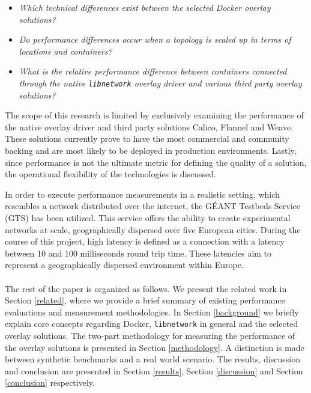 \begin{itemize}
	\setlength\itemsep{1pt}
    \item \textit{Which technical differences exist between the selected Docker overlay solutions?}
    \item \textit{Do performance differences occur when a topology is scaled up in terms of locations and containers?}
    \item \textit{What is the relative performance difference between containers connected through the native \texttt{libnetwork} overlay driver and various third party overlay solutions?}
\end{itemize}

\noindent
The scope of this research is limited by exclusively examining the performance of the native overlay driver and third party solutions Calico, Flannel and Weave. These solutions currently prove to have the most commercial and community backing and are most likely to be deployed in production environments. Lastly, since performance is not the ultimate metric for defining the quality of a solution, the operational flexibility of the technologies is discussed. 

In order to execute performance measurements in a realistic setting, which resembles a network distributed over the internet, the GÉANT Testbeds Service (GTS) has been utilized. This service offers the ability to create experimental networks at scale, geographically dispersed over five European cities. During the course of this project, high latency is defined as a connection with a latency between 10 and 100 milliseconds round trip time. These latencies aim to represent a geographically dispersed environment within Europe. 
\\\\
The rest of the paper is organized as follows. We present the related work in Section \ref{related}, where we provide a brief summary of existing performance evaluations and measurement methodologies. In Section \ref{background} we briefly explain core concepts regarding Docker, \texttt{libnetwork} in general and the selected overlay solutions. The two-part methodology for measuring the performance of the overlay solutions is presented in Section \ref{methodology}. A distinction is made between synthetic benchmarks and a real world scenario. The results, discussion and conclusion are presented in Section \ref{results}, Section \ref{discussion} and Section \ref{conclusion} respectively. 
